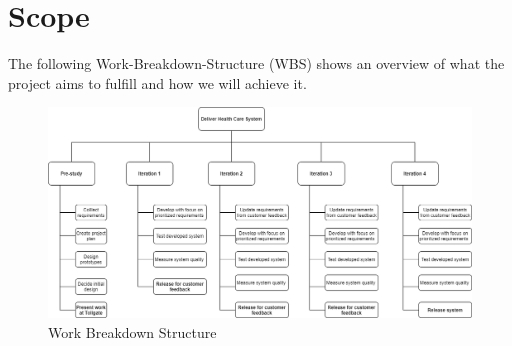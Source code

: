 \section{Scope}

\label{sec:scope}

The following Work-Breakdown-Structure (WBS) shows an overview of what the project aims to fulfill and how we will achieve it.
\begin{figure}[ht]
    \centering\includegraphics[width=1 \linewidth]{figures/wbs_tddc88.png}
    \caption{Work Breakdown Structure}
    \label{fig:example1}
\end{figure}

